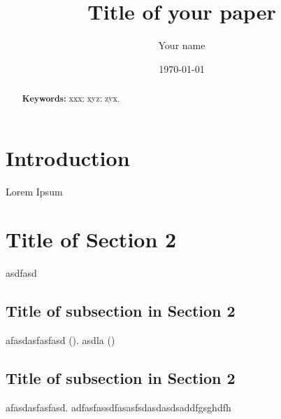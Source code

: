 \documentclass[11pt]{article}
\title{Title of your paper}
\author{Your name}
\date{\today}
\begin{document}
\maketitle


\begin{abstract}
	\singlespacing
	\noindent 
	
	\noindent \textbf{Keywords:} xxx; xyz; zyx. 
\end{abstract}


\section{Introduction}
Lorem Ipsum
\section{Title of Section 2}
asdfasd
\subsection{Title of subsection in Section 2}
afasdasfasfasd (\cite{Landrigan.2017}). asdla (\cite{Test.01012022})
\subsection{Title of subsection in Section 2}
afasdasfasfasd.
adfasfassdfasasfsdasdasdsaddfgsghdfh
\end{document}
